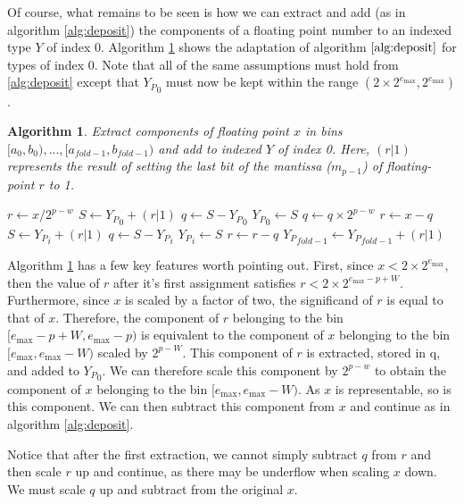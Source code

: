\documentclass[12pt]{article}
\providecommand{\max}{\ensuremath{\text{max}}}
\theoremstyle{plain}
\newtheorem{alg}{Algorithm}[section]
\begin{document}
      Of course, what remains to be seen is how we can extract and add (as in algorithm \ref{alg:deposit}) the components of a floating point number to an indexed type $Y$ of index 0. Algorithm \ref{alg:deposit0} shows the adaptation of algorithm $\ref{alg:deposit}$ for types of index 0. Note that all of the same assumptions must hold from \ref{alg:deposit} except that ${Y_P}_0$ must now be kept within the range $(2 \times 2^{e_{\max}}, 2^{e_{\max}})$.
      \begin{alg}
        Extract components of floating point $x$ in bins $[a_0, b_0), ..., [a_{fold - 1}, b_{fold - 1})$ and add to indexed $Y$ of index 0. Here, $(r | 1)$ represents the result of setting the last bit of the mantissa ($m_{p - 1}$) of floating-point $r$ to 1.
        \begin{algorithmic}
            \State $r \gets x / 2^{p - w}$
            \State $S \gets {Y_P}_0 + (r | 1)$
            \State $q \gets S - {Y_P}_0$
            \State ${Y_P}_0 \gets S$
            \State $q \gets q \times 2^{p - w}$
            \State $r \gets x - q$
              \State $S \gets {Y_P}_i + (r | 1)$
              \State $q \gets S - {Y_P}_i$
              \State ${Y_P}_i \gets S$
              \State $r \gets r - q$
            \EndFor
            \State ${Y_P}_{fold - 1} \gets {Y_P}_{fold - 1} + (r | 1)$
          \EndFunction
        \end{algorithmic}
        \label{alg:deposit0}
      \end{alg}

      Algorithm \ref{alg:deposit0} has a few key features worth pointing out. First, since $x < 2 \times 2^{e_{\max}}$, then the value of $r$ after it's first assignment satisfies $r < 2 \times 2^{e_{\max} - p + W}$.
      Furthermore, since $x$ is scaled by a factor of two, the significand of $r$ is equal to that of $x$.
      Therefore, the component of $r$ belonging to the bin $[e_{\max} - p + W, e_{\max} - p)$ is equivalent to the component of $x$ belonging to the bin $[e_{\max}, e_{\max} - W)$ scaled by $2^{p - W}$. This component of $r$ is extracted, stored in q, and added to ${Y_P}_0$. We can therefore scale this component by $2^{p - w}$ to obtain the component of $x$ belonging to the bin $[e_{\max}, e_{\max} - W)$. As $x$ is representable, so is this component. We can then subtract this component from $x$ and continue as in algorithm \ref{alg:deposit}.

      Notice that after the first extraction, we cannot simply subtract $q$ from $r$ and then scale $r$ up and continue, as there may be underflow when scaling $x$ down. We must scale $q$ up and subtract from the original $x$.
\end{document}
